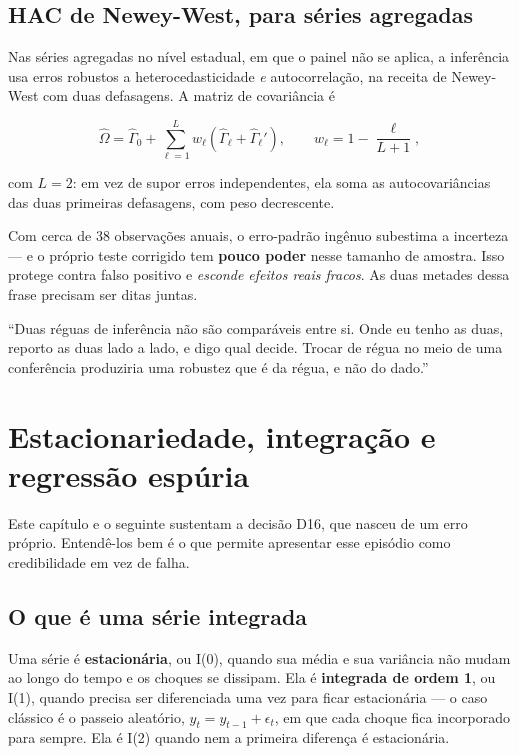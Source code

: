 \section{HAC de Newey-West, para séries agregadas}

Nas séries agregadas no nível estadual, em que o painel não se aplica, a
inferência usa erros robustos a heterocedasticidade \emph{e} autocorrelação, na
receita de Newey-West com duas defasagens. A matriz de covariância é

\begin{equation}
\hat{\Omega} = \hat{\Gamma}_0 + \sum_{\ell=1}^{L} w_\ell \left(\hat{\Gamma}_\ell + \hat{\Gamma}_\ell'\right),
\qquad w_\ell = 1 - \frac{\ell}{L+1},
\end{equation}

com $L = 2$: em vez de supor erros independentes, ela soma as autocovariâncias
das duas primeiras defasagens, com peso decrescente.

\begin{naodiz}
Com cerca de 38 observações anuais, o erro-padrão ingênuo subestima a incerteza
--- e o próprio teste corrigido tem \textbf{pouco poder} nesse tamanho de
amostra. Isso protege contra falso positivo e \emph{esconde efeitos reais
fracos}. As duas metades dessa frase precisam ser ditas juntas.
\end{naodiz}

\begin{nabanca}
``Duas réguas de inferência não são comparáveis entre si. Onde eu tenho as duas,
reporto as duas lado a lado, e digo qual decide. Trocar de régua no meio de uma
conferência produziria uma robustez que é da régua, e não do dado.''
\end{nabanca}

\chapter{Estacionariedade, integração e regressão espúria}
\label{cap:integracao}

Este capítulo e o seguinte sustentam a decisão D16, que nasceu de um erro
próprio. Entendê-los bem é o que permite apresentar esse episódio como
credibilidade em vez de falha.

\section{O que é uma série integrada}

Uma série é \textbf{estacionária}, ou I(0), quando sua média e sua variância não
mudam ao longo do tempo e os choques se dissipam. Ela é \textbf{integrada de
ordem 1}, ou I(1), quando precisa ser diferenciada uma vez para ficar
estacionária --- o caso clássico é o passeio aleatório, $y_t = y_{t-1} +
\epsilon_t$, em que cada choque fica incorporado para sempre. Ela é I(2) quando
nem a primeira diferença é estacionária.

